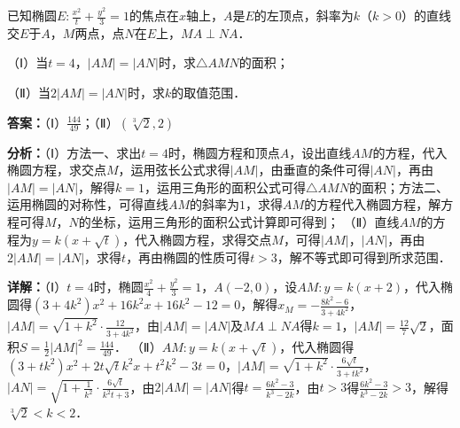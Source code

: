 \begin{question}[points=12]
已知椭圆$E:\frac{x^2}{t}+\frac{y^2}{3}=1$的焦点在$x$轴上，$A$是$E$的左顶点，斜率为$k$（$k>0$）的直线交$E$于$A$，$M$两点，点$N$在$E$上，$MA\perp NA$．

（Ⅰ）当$t=4$，$|AM|=|AN|$时，求$\triangle AMN$的面积；

（Ⅱ）当$2|AM|=|AN|$时，求$k$的取值范围．
\begin{solution}
\textbf{答案：}（Ⅰ）$\frac{144}{49}$；（Ⅱ）$(\sqrt[3]{2},2)$

\textbf{分析：}（Ⅰ）方法一、求出$t=4$时，椭圆方程和顶点$A$，设出直线$AM$的方程，代入椭圆方程，求交点$M$，运用弦长公式求得$|AM|$，由垂直的条件可得$|AN|$，再由$|AM|=|AN|$，解得$k=1$，运用三角形的面积公式可得$\triangle AMN$的面积；方法二、运用椭圆的对称性，可得直线$AM$的斜率为$1$，求得$AM$的方程代入椭圆方程，解方程可得$M$，$N$的坐标，运用三角形的面积公式计算即可得到；
（Ⅱ）直线$AM$的方程为$y=k(x+\sqrt{t})$，代入椭圆方程，求得交点$M$，可得$|AM|$，$|AN|$，再由$2|AM|=|AN|$，求得$t$，再由椭圆的性质可得$t>3$，解不等式即可得到所求范围．

\textbf{详解：}（Ⅰ）$t=4$时，椭圆$\frac{x^2}{4}+\frac{y^2}{3}=1$，$A(-2,0)$，设$AM:y=k(x+2)$，代入椭圆得$(3+4k^2)x^2+16k^2x+16k^2-12=0$，解得$x_M=-\frac{8k^2-6}{3+4k^2}$，$|AM|=\sqrt{1+k^2}\cdot\frac{12}{3+4k^2}$，由$|AM|=|AN|$及$MA\perp NA$得$k=1$，$|AM|=\frac{12}{7}\sqrt{2}$，面积$S=\frac12|AM|^2=\frac{144}{49}$．
（Ⅱ）$AM:y=k(x+\sqrt{t})$，代入椭圆得$(3+tk^2)x^2+2t\sqrt{t}k^2x+t^2k^2-3t=0$，$|AM|=\sqrt{1+k^2}\cdot\frac{6\sqrt{t}}{3+tk^2}$，$|AN|=\sqrt{1+\frac{1}{k^2}}\cdot\frac{6\sqrt{t}}{k^2t+3}$，由$2|AM|=|AN|$得$t=\frac{6k^2-3}{k^3-2k}$，由$t>3$得$\frac{6k^2-3}{k^3-2k}>3$，解得$\sqrt[3]{2}<k<2$．
\end{solution}
\end{question}

